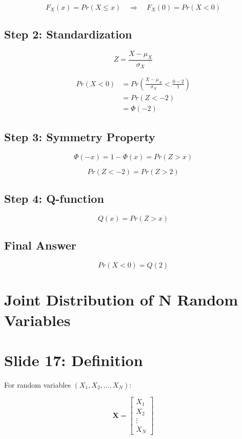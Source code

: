 \documentclass[12pt]{article}
\begin{document}
\[
F_X(x) = Pr(X \le x)
\quad \Rightarrow \quad
F_X(0) = Pr(X < 0)
\]

\subsection*{Step 2: Standardization}

\[
Z = \frac{X - \mu_X}{\sigma_X}
\]

\[
\begin{aligned}
Pr(X < 0) &=
Pr\left(
\frac{X - \mu_X}{\sigma_X} < \frac{0 - 2}{1}
\right) \\
&= Pr(Z < -2) \\
&= \Phi(-2)
\end{aligned}
\]

\subsection*{Step 3: Symmetry Property}

\[
\Phi(-x) = 1 - \Phi(x) = Pr(Z > x)
\]

\[
Pr(Z < -2) = Pr(Z > 2)
\]

\subsection*{Step 4: Q-function}

\[
Q(x) = Pr(Z > x)
\]

\subsection*{Final Answer}

\[
Pr(X < 0) = Q(2)
\]

\section*{Joint Distribution of N Random Variables}

\section*{Slide 17: Definition}

For random variables $(X_1, X_2, \dots, X_N)$:

\[
\mathbf{X} =
\begin{bmatrix}
X_1 \\
X_2 \\
\vdots \\
X_N
\end{bmatrix}
\]
\end{document}
